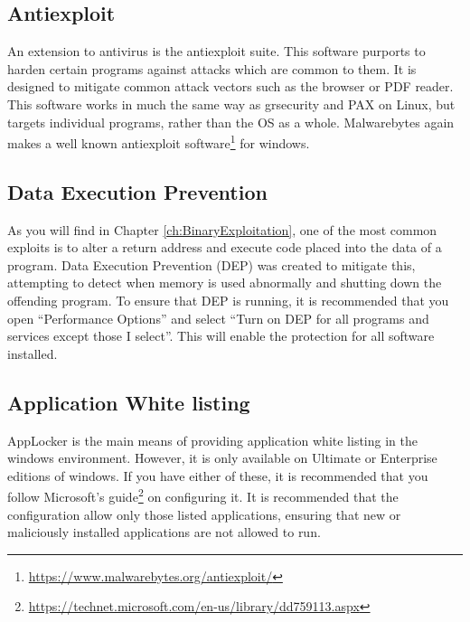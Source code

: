 \documentclass[a4paper,11pt]{report}
\begin{document}
		\subsection{Antiexploit}
			An extension to antivirus is the antiexploit suite. 
			This software purports to harden certain programs against attacks which are common to them. 
			It is designed to mitigate common attack vectors such as the browser or PDF reader. 
			This software works in much the same way as grsecurity and PAX on Linux, but targets individual programs, rather than the OS as a whole. 
			Malwarebytes again makes a well known antiexploit software\footnote{\url{https://www.malwarebytes.org/antiexploit/}} for windows. 
		\subsection{Data Execution Prevention}
			As you will find in Chapter \ref{ch:BinaryExploitation}, 
			one of the most common exploits is to alter a return address and execute code placed into the data of a program. 
			Data Execution Prevention (DEP) was created to mitigate this, attempting to detect when memory is used abnormally and shutting down the offending program. 
			To ensure that DEP is running, it is recommended that you open ``Performance Options'' and select ``Turn on DEP for all programs and services except those I select''. 
			This will enable the protection for all software installed. 
		\subsection{Application White listing}
			AppLocker is the main means of providing application white listing in the windows environment. 
			However, it is only available on Ultimate or Enterprise editions of windows. 
			If you have either of these, it is recommended that you follow Microsoft's guide\footnote{\url{https://technet.microsoft.com/en-us/library/dd759113.aspx}} on configuring it. 
			It is recommended that the configuration allow only those listed applications,
			ensuring that new or maliciously installed applications are not allowed to run. 
\end{document}
